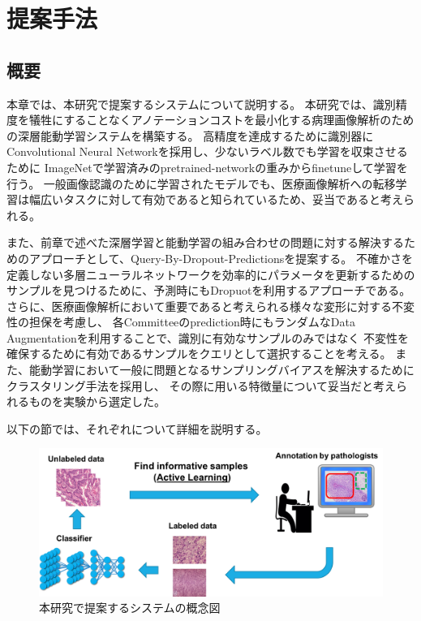 \chapter{提案手法}

\section{概要}
本章では、本研究で提案するシステムについて説明する。
本研究では、識別精度を犠牲にすることなくアノテーションコストを最小化する病理画像解析のための深層能動学習システムを構築する。
高精度を達成するために識別器にConvolutional Neural Networkを採用し、少ないラベル数でも学習を収束させるために
ImageNetで学習済みのpretrained-networkの重みからfinetuneして学習を行う。
一般画像認識のために学習されたモデルでも、医療画像解析への転移学習は幅広いタスクに対して有効であると知られているため、妥当であると考えられる。

また、前章で述べた深層学習と能動学習の組み合わせの問題に対する解決するためのアプローチとして、Query-By-Dropout-Predictionsを提案する。
不確かさを定義しない多層ニューラルネットワークを効率的にパラメータを更新するためのサンプルを見つけるために、予測時にもDropuotを利用するアプローチである。
さらに、医療画像解析において重要であると考えられる様々な変形に対する不変性の担保を考慮し、
各Committeeのprediction時にもランダムなData Augmentationを利用することで、識別に有効なサンプルのみではなく
不変性を確保するために有効であるサンプルをクエリとして選択することを考える。
また、能動学習において一般に問題となるサンプリングバイアスを解決するためにクラスタリング手法を採用し、
その際に用いる特徴量について妥当だと考えられるものを実験から選定した。

以下の節では、それぞれについて詳細を説明する。

\clearpage

\begin{figure}[tbp]
    \label{fig:overview}
     \begin{center}
      \includegraphics[width=120mm]{figures/overview.png}
     \end{center}
    \caption{本研究で提案するシステムの概念図}
\end{figure}

